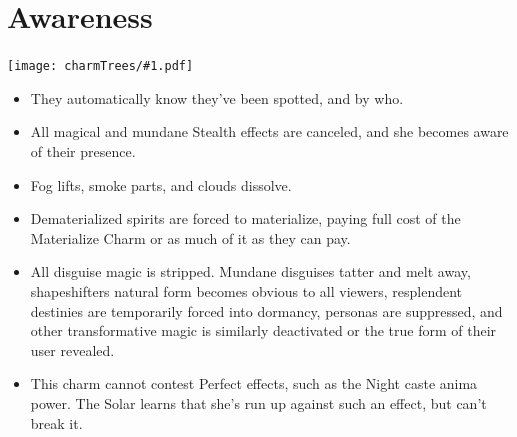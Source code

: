 \documentclass[oneside]{book}
\newenvironment{Ability}[1]{%
  \section{#1}%
  \vspace{-0.25in}\texttt{[image: charmTrees/\#1.pdf]}%
  \begin{multicols}{2}
}
{
  \end{multicols}
}
\begin{document}
\begin{Ability}{Awareness}
  \begin{itemize}
    \item They automatically know they've been spotted, and by who.
    \item All magical and mundane Stealth effects are canceled, and she becomes aware of their presence.
    \item Fog lifts, smoke parts, and clouds dissolve.
    \item Dematerialized spirits are forced to materialize, paying full cost of the Materialize Charm or as much of it as they can pay.
    \item All disguise magic is stripped. Mundane disguises tatter and melt away, shapeshifters natural form becomes obvious to all viewers, resplendent destinies are temporarily forced into dormancy, personas are suppressed, and other transformative magic is similarly deactivated or the true form of their user revealed.
    \item This charm cannot contest Perfect effects, such as the Night caste anima power. The Solar learns that she's run up against such an effect, but can't break it.
  \end{itemize}

\end{Ability}
\end{document}
